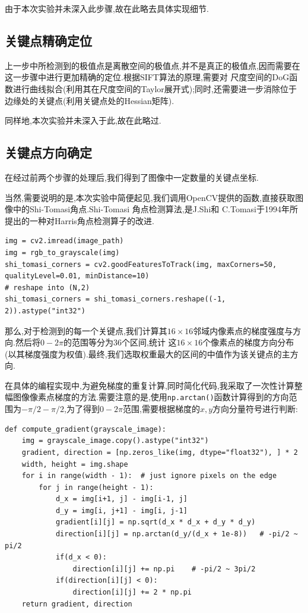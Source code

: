 \documentclass[a4paper]{article}
\begin{document}
由于本次实验并未深入此步骤,故在此略去具体实现细节.
        \subsection{关键点精确定位}
上一步中所检测到的极值点是离散空间的极值点,并不是真正的极值点,因而需要在这一步骤中进行更加精确的定位.根据SIFT算法的原理,需要对
尺度空间的DoG函数进行曲线拟合(利用其在尺度空间的Taylor展开式);同时,还需要进一步消除位于边缘处的关键点(利用关键点处的Hessian矩阵).

同样地,本次实验并未深入于此,故在此略过.
        \subsection{关键点方向确定}
在经过前两个步骤的处理后,我们得到了图像中一定数量的关键点坐标.

当然,需要说明的是,本次实验中简便起见,我们调用OpenCV提供的函数,直接获取图像中的Shi-Tomasi角点.Shi-Tomasi 角点检测算法,是J.Shi和
C.Tomasi于1994年所提出的一种对Harris角点检测算子的改进.
\begin{verbatim}
img = cv2.imread(image_path)
img = rgb_to_grayscale(img)
shi_tomasi_corners = cv2.goodFeaturesToTrack(img, maxCorners=50, qualityLevel=0.01, minDistance=10)
# reshape into (N,2)
shi_tomasi_corners = shi_tomasi_corners.reshape((-1, 2)).astype("int32")

\end{verbatim}

那么,对于检测到的每一个关键点,我们计算其$16\times16$邻域内像素点的梯度强度与方向.然后将$0 - 2\pi$的范围等分为36个区间,统计
这$16\times16$个像素点的梯度方向分布(以其梯度强度为权值).最终,我们选取权重最大的区间的中值作为该关键点的主方向.

在具体的编程实现中,为避免梯度的重复计算,同时简化代码,我采取了一次性计算整幅图像像素点梯度的方法.需要注意的是,使用\texttt
{np.arctan()}函数计算得到的方向范围为$-\pi /2  -  \pi /2$,为了得到$0  -  2\pi$范围,需要根据梯度的$x,y$方向分量符号进行判断:
\begin{verbatim}
def compute_gradient(grayscale_image):
    img = grayscale_image.copy().astype("int32")
    gradient, direction = [np.zeros_like(img, dtype="float32"), ] * 2
    width, height = img.shape
    for i in range(width - 1):  # just ignore pixels on the edge
        for j in range(height - 1):
            d_x = img[i+1, j] - img[i-1, j]
            d_y = img[i, j+1] - img[i, j-1]
            gradient[i][j] = np.sqrt(d_x * d_x + d_y * d_y)
            direction[i][j] = np.arctan(d_y/(d_x + 1e-8))   # -pi/2 ~ pi/2
            if(d_x < 0):
                direction[i][j] += np.pi    # -pi/2 ~ 3pi/2
            if(direction[i][j] < 0):
                direction[i][j] += 2 * np.pi
    return gradient, direction
\end{verbatim}
\end{document}
